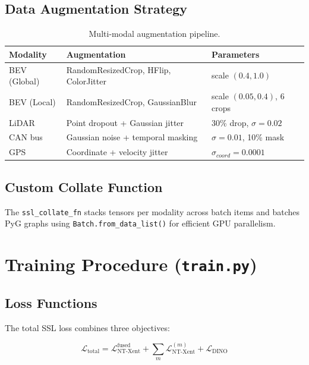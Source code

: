 \documentclass[12pt,a4paper]{article}
\begin{document}
\subsection{Data Augmentation Strategy}

\begin{table}[H]
\centering
\renewcommand{\arraystretch}{1.3}
\begin{tabular}{lll}
\toprule
\textbf{Modality} & \textbf{Augmentation} & \textbf{Parameters} \\
\midrule
BEV (Global)  & RandomResizedCrop, HFlip, ColorJitter & scale $(0.4, 1.0)$ \\
BEV (Local)   & RandomResizedCrop, GaussianBlur       & scale $(0.05, 0.4)$, 6 crops \\
LiDAR         & Point dropout + Gaussian jitter        & 30\% drop, $\sigma=0.02$ \\
CAN bus       & Gaussian noise + temporal masking      & $\sigma=0.01$, 10\% mask \\
GPS           & Coordinate + velocity jitter           & $\sigma_{coord}=0.0001$ \\
\bottomrule
\end{tabular}
\caption{Multi-modal augmentation pipeline.}
\end{table}

\subsection{Custom Collate Function}

The \texttt{ssl\_collate\_fn} stacks tensors per modality across batch items and
batches PyG graphs using \texttt{Batch.from\_data\_list()} for efficient GPU parallelism.

\section{Training Procedure (\texttt{train.py})}

\subsection{Loss Functions}

The total SSL loss combines three objectives:

\begin{equation}
    \mathcal{L}_{\text{total}} = \mathcal{L}_{\text{NT-Xent}}^{\text{fused}} + \sum_{m} \mathcal{L}_{\text{NT-Xent}}^{(m)} + \mathcal{L}_{\text{DINO}}
\end{equation}
\end{document}
